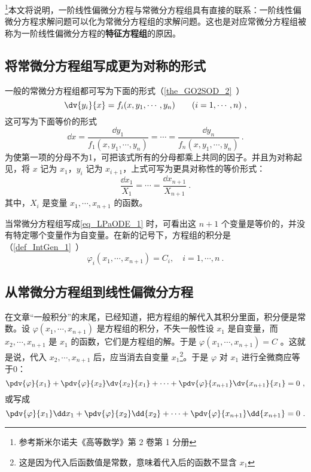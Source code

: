 \footnote{参考斯米尔诺夫《高等数学》第 2 卷第 1 分册}本文将说明，一阶线性偏微分方程与常微分方程组具有直接的联系：一阶线性偏微分方程求解问题可以化为常微分方程组的求解问题。这也是对应常微分方程组被称为一阶线性偏微分方程的\textbf{特征方程组}的原因。
\subsection{将常微分方程组写成更为对称的形式}
一般的常微分方程组都可写为下面的形式（\autoref{the_GO2SOD_2}~）
\begin{equation}\label{eq_LPaODE_4}
\dv{y_i}{x}=f_i(x,y_1,\cdots,y_n) \qquad (i=1,\cdots,n)~,
\end{equation}
这可写为下面等价的形式
\begin{equation}
\dd x=\frac{\dd y_1}{f_1(x,y_1,\cdots,y_n)}=\cdots=\frac{\dd y_n}{f_n(x,y_1,\cdots,y_n)}~.
\end{equation}
为使第一项的分母不为1，可把该式所有的分母都乘上共同的因子。并且为对称起见，将 $x$ 记为 $x_1$，$y_i$ 记为 $x_{i+1}$，上式可写为更具对称性的等价形式：
\begin{equation}\label{eq_LPaODE_1}
\frac{\dd x_1}{X_1}=\cdots=\frac{\dd x_{n+1}}{X_{n+1}}~.
\end{equation}
其中，$X_i$ 是变量 $x_1,\cdots,x_{n+1}$ 的函数。

当常微分方程组写成\autoref{eq_LPaODE_1} 时，可看出这 $n+1$ 个变量是等价的，并没有特定哪个变量作为自变量。在新的记号下，方程组的积分是（\autoref{def_IntGen_1}~）
\begin{equation}
\varphi_i(x_1,\cdots,x_{n+1})=C_i,\quad i=1,\cdots,n~.
\end{equation}
\subsection{从常微分方程组到线性偏微分方程}
在文章“一般积分”的末尾，已经知道，把方程组的解代入其积分里面，积分便是常数。设 $\varphi(x_1,\cdots,x_{n+1})$ 是方程组的积分，不失一般性设 $x_1$ 是自变量，而 $x_2,\cdots,x_{n+1}$ 是 $x_1$ 的函数，它们是方程组的解。于是 $\varphi(x_1,\cdots,x_{n+1})=C$ 。这就是说，代入 $x_2,\cdots,x_{n+1}$ 后，应当消去自变量 $x_1$\footnote{这是因为代入后函数值是常数，意味着代入后的函数不显含 $x_1$}。于是 $\varphi$ 对 $x_1$ 进行全微商应等于0：
\begin{equation}
\pdv{\varphi}{x_1}+\pdv{\varphi}{x_2}\dv{x_2}{x_1}+\cdots+\pdv{\varphi}{x_{n+1}}\dv{x_{n+1}}{x_1}=0~,
\end{equation}
或写成
\begin{equation}\label{eq_LPaODE_2}
\pdv{\varphi}{x_1}\dd x_1+\pdv{\varphi}{x_2}\dd{x_2}+\cdots+\pdv{\varphi}{x_{n+1}}\dd{x_{n+1}}=0~.
\end{equation}


